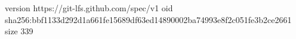 version https://git-lfs.github.com/spec/v1
oid sha256:bbf1133d292d1a661fe15689df63ed14890002ba74993e8f2c051fe3b2ce2661
size 339
